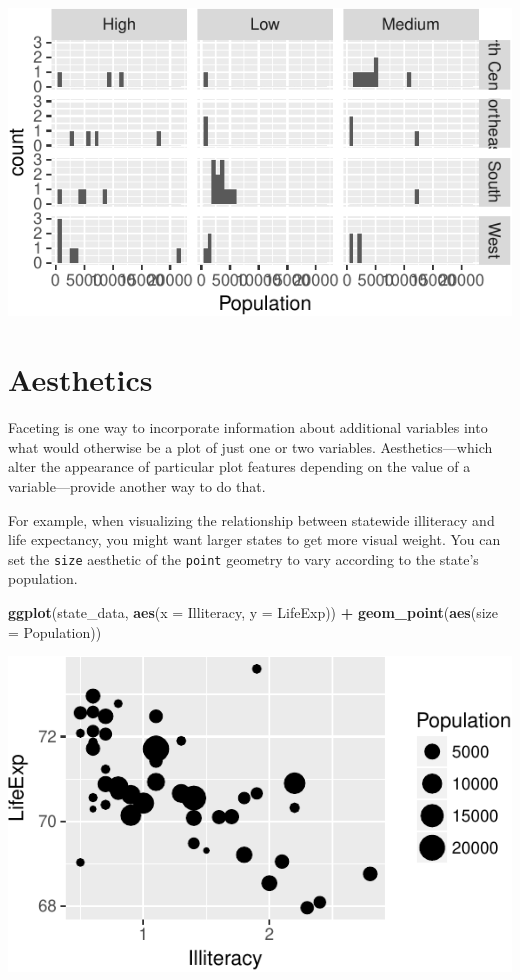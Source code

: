 \documentclass[12pt,oneside,openany]{book}
\newenvironment{Shaded}{\begin{snugshade}}{\end{snugshade}}
\newcommand{\KeywordTok}[1]{\textcolor[rgb]{0.13,0.29,0.53}{\textbf{#1}}}
\newcommand{\DataTypeTok}[1]{\textcolor[rgb]{0.13,0.29,0.53}{#1}}
\newcommand{\StringTok}[1]{\textcolor[rgb]{0.31,0.60,0.02}{#1}}
\newcommand{\OperatorTok}[1]{\textcolor[rgb]{0.81,0.36,0.00}{\textbf{#1}}}
\newcommand{\NormalTok}[1]{#1}
\begin{document}
\includegraphics{pdaps_files/figure-latex/facet-grid-1.pdf}

\section{Aesthetics}\label{aesthetics}

Faceting is one way to incorporate information about additional
variables into what would otherwise be a plot of just one or two
variables. Aesthetics---which alter the appearance of particular plot
features depending on the value of a variable---provide another way to
do that.

For example, when visualizing the relationship between statewide
illiteracy and life expectancy, you might want larger states to get more
visual weight. You can set the \texttt{size} aesthetic of the
\texttt{point} geometry to vary according to the state's population.

\begin{Shaded}
\begin{Highlighting}[]
\KeywordTok{ggplot}\NormalTok{(state_data, }\KeywordTok{aes}\NormalTok{(}\DataTypeTok{x =}\NormalTok{ Illiteracy, }\DataTypeTok{y =}\NormalTok{ LifeExp)) }\OperatorTok{+}
\StringTok{  }\KeywordTok{geom_point}\NormalTok{(}\KeywordTok{aes}\NormalTok{(}\DataTypeTok{size =}\NormalTok{ Population))}
\end{Highlighting}
\end{Shaded}

\includegraphics{pdaps_files/figure-latex/aes-size-1.pdf}
\end{document}
